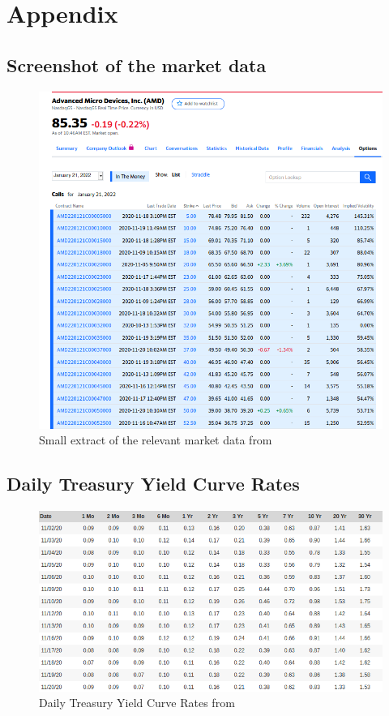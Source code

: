 \documentclass[11pt,oneside,a4paper]{article}
\begin{document}
	\section{Appendix}
	\subsection{Screenshot of the market data}
	\begin{figure}[H]
		\centering
		\includegraphics[width=\linewidth]{screenshot.png}
		\caption{\label{treasure}Small extract of the relevant market data from \cite{site_yahoofinance}} 
	\end{figure}
	\subsection{Daily Treasury Yield Curve Rates}
	\begin{figure}[H]
		\centering
		\includegraphics[width=0.8\linewidth]{treasure.png}
		\caption{\label{treasure}Daily Treasury Yield Curve Rates from \cite{site_treasure}} 
	\end{figure}
	\newpage
	
	
	
	 
\end{document}
